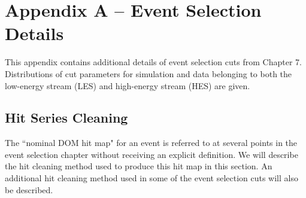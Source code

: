 \documentclass{gatech-thesis}
\begin{document}
\appendix

\chapter{Appendix A -- Event Selection Details}
This appendix contains additional details of event selection cuts from Chapter 7. Distributions of cut parameters for simulation and data belonging to both the low-energy stream (LES) and high-energy stream (HES) are given.
\section{Hit Series Cleaning}
The ``nominal DOM hit map" for an event is referred to at several points in the event selection chapter without receiving an explicit definition. We will describe the hit cleaning method used to produce this hit map in this section. An additional hit cleaning method used in some of the event selection cuts will also be described.
\end{document}
